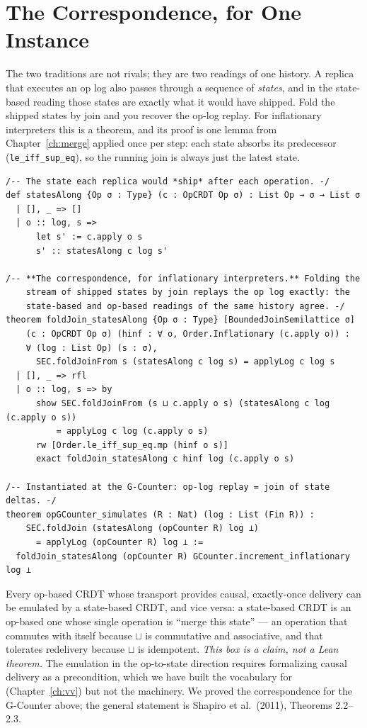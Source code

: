 \documentclass[12pt, a4paper, openright]{book}
\theoremstyle{thmstyle}
\theoremstyle{defstyle}
\newcommand{\lc}[1]{\texttt{#1}}
\newenvironment{thmbox}[1][]{%
  \begin{tcolorbox}[thmbox, title={\ifx\\#1\\Theorem\else#1\fi}]%
}{\end{tcolorbox}}
\begin{document}
\section{The Correspondence, for One Instance}

The two traditions are not rivals; they are two readings of one history.
A replica that executes an op log also passes through a sequence of
\emph{states}, and in the state-based reading those states are exactly
what it would have shipped. Fold the shipped states by join and you
recover the op-log replay. For inflationary interpreters this is a
theorem, and its proof is one lemma from Chapter~\ref{ch:merge} applied
once per step: each state absorbs its predecessor
(\lc{le_iff_sup_eq}), so the running join is always just the latest
state.

\begin{verbatim}
/-- The state each replica would *ship* after each operation. -/
def statesAlong {Op σ : Type} (c : OpCRDT Op σ) : List Op → σ → List σ
  | [], _ => []
  | o :: log, s =>
      let s' := c.apply o s
      s' :: statesAlong c log s'

/-- **The correspondence, for inflationary interpreters.** Folding the
    stream of shipped states by join replays the op log exactly: the
    state-based and op-based readings of the same history agree. -/
theorem foldJoin_statesAlong {Op σ : Type} [BoundedJoinSemilattice σ]
    (c : OpCRDT Op σ) (hinf : ∀ o, Order.Inflationary (c.apply o)) :
    ∀ (log : List Op) (s : σ),
      SEC.foldJoinFrom s (statesAlong c log s) = applyLog c log s
  | [], _ => rfl
  | o :: log, s => by
      show SEC.foldJoinFrom (s ⊔ c.apply o s) (statesAlong c log (c.apply o s))
          = applyLog c log (c.apply o s)
      rw [Order.le_iff_sup_eq.mp (hinf o s)]
      exact foldJoin_statesAlong c hinf log (c.apply o s)

/-- Instantiated at the G-Counter: op-log replay = join of state deltas. -/
theorem opGCounter_simulates (R : Nat) (log : List (Fin R)) :
    SEC.foldJoin (statesAlong (opCounter R) log ⊥)
      = applyLog (opCounter R) log ⊥ :=
  foldJoin_statesAlong (opCounter R) GCounter.increment_inflationary log ⊥
\end{verbatim}

\begin{thmbox}[The general correspondence (stated, not proved here)]
  Every op-based CRDT whose transport provides causal, exactly-once
  delivery can be emulated by a state-based CRDT, and vice versa: a
  state-based CRDT is an op-based one whose single operation is
  ``merge this state'' --- an operation that commutes with itself
  because $\sqcup$ is commutative and associative, and that tolerates
  redelivery because $\sqcup$ is idempotent.
  \emph{This box is a claim, not a Lean theorem.} The emulation in the
  op-to-state direction requires formalizing causal delivery as a
  precondition, which we have built the vocabulary for
  (Chapter~\ref{ch:vv}) but not the machinery. We proved the
  correspondence for the G-Counter above; the general statement is
  Shapiro et al.\ (2011), Theorems 2.2--2.3.
\end{thmbox}
\end{document}

